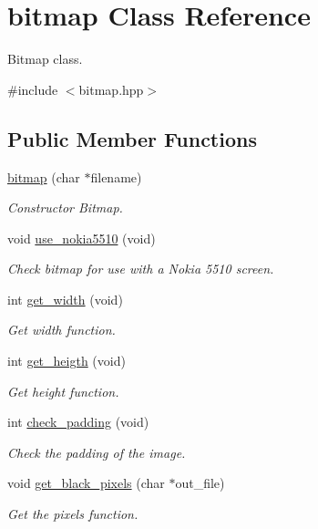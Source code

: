 \hypertarget{classbitmap}{}\section{bitmap Class Reference}
\label{classbitmap}


Bitmap class.  




{\ttfamily \#include $<$bitmap.\+hpp$>$}

\subsection*{Public Member Functions}
\begin{DoxyCompactItemize}
\item 
\hyperlink{classbitmap_a1b4f88c58682ffb0fa14de38a3c4365c}{bitmap} (char $\ast$filename)
\begin{DoxyCompactList}\small\item\em Constructor Bitmap. \end{DoxyCompactList}\item 
void \hyperlink{classbitmap_a62aec4680ba36e7e193a43987276eded}{use\+\_\+nokia5510} (void)
\begin{DoxyCompactList}\small\item\em Check bitmap for use with a Nokia 5510 screen. \end{DoxyCompactList}\item 
int \hyperlink{classbitmap_a268eb76570f4702cac1cd20a1e623108}{get\+\_\+width} (void)
\begin{DoxyCompactList}\small\item\em Get width function. \end{DoxyCompactList}\item 
int \hyperlink{classbitmap_a879ab1c22b332708bc8115dbcb3ab8af}{get\+\_\+heigth} (void)
\begin{DoxyCompactList}\small\item\em Get height function. \end{DoxyCompactList}\item 
int \hyperlink{classbitmap_a927707c46dd2e618c9c4b275aa84ba13}{check\+\_\+padding} (void)
\begin{DoxyCompactList}\small\item\em Check the padding of the image. \end{DoxyCompactList}\item 
void \hyperlink{classbitmap_a17cd715d6dc8c8f3af2dbe4fe669b04b}{get\+\_\+black\+\_\+pixels} (char $\ast$out\+\_\+file)
\begin{DoxyCompactList}\small\item\em Get the pixels function. \end{DoxyCompactList}\end{DoxyCompactItemize}


